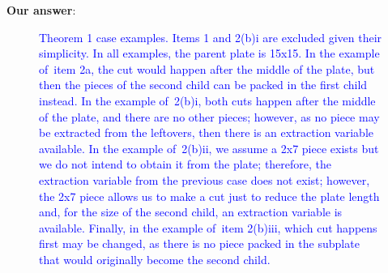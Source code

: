 \documentclass[smallextended]{svjour3}       %
\makeatletter
\newif\iffinalversion
\newcommand{\newtext}[1]{\iffinalversion%
#1%
\else%
\textcolor{blue}{#1}%
\fi%
}
\newcommand\gobblepars{%
    \@ifnextchar\par%
        {\expandafter\gobblepars\@gobble}%
        {}}
\newcounter{answer}
\newenvironment{answer}{%
    \refstepcounter{answer}\par\smallskip\noindent%
    \textbf{Our answer}: \gobblepars}%
    {\unskip\bigskip}
\makeatother
\begin{document}
\begin{answer}
\begin{figure}
\begin{tikzpicture}[scale=0.22]
\end{tikzpicture}
\caption{\newtext{Theorem 1 case examples. Items 1 and 2(b)i are excluded given their simplicity. In all examples, the parent plate is 15x15. In the example of~item 2a, the cut would happen after the middle of the plate, but then the pieces of the second child can be packed in the first child instead. In the example of~2(b)i, both cuts happen after the middle of the plate, and there are no other pieces; however, as no piece may be extracted from the leftovers, then there is an extraction variable available. In the example of~2(b)ii, we assume a 2x7 piece exists but we do not intend to obtain it from the plate; therefore, the extraction variable from the previous case does not exist; however, the 2x7 piece allows us to make a cut just to reduce the plate length and, for the size of the second child, an extraction variable is available. Finally, in the example of~item 2(b)iii, which cut happens first may be changed, as there is no piece packed in the subplate that would originally become the second child.}}
\end{figure}
\end{answer}
\end{document}
